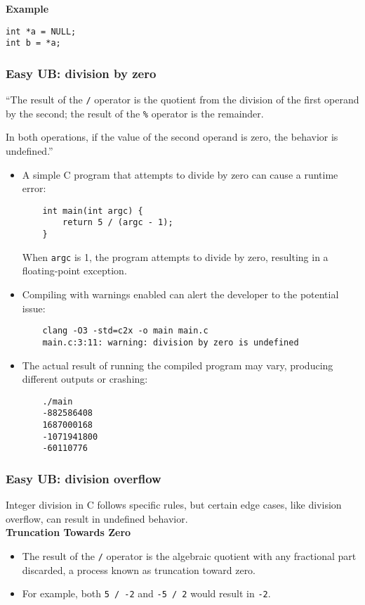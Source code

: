 \documentclass[12pt]{article}
\begin{document}
\textbf{Example}
\begin{verbatim}
int *a = NULL;
int b = *a;
\end{verbatim}

\subsubsection{Easy UB: division by zero}

``The result of the \texttt{/} operator is the quotient from the division of the first operand by the second;
the result of the \texttt{\%} operator is the remainder.

In both operations, if the value of the second operand is zero, the behavior is undefined.''

\begin{itemize}
    \item A simple C program that attempts to divide by zero can cause a runtime error:
    \begin{verbatim}
    int main(int argc) {
        return 5 / (argc - 1);
    }
    \end{verbatim}
    When \texttt{argc} is 1, the program attempts to divide by zero, resulting in a floating-point exception.

    \item Compiling with warnings enabled can alert the developer to the potential issue:
    \begin{verbatim}
    clang -O3 -std=c2x -o main main.c
    main.c:3:11: warning: division by zero is undefined
    \end{verbatim}
    
    \item The actual result of running the compiled program may vary, producing different outputs or crashing:
    \begin{verbatim}
    ./main
    -882586408
    1687000168
    -1071941800
    -60110776
    \end{verbatim}
\end{itemize}

\subsubsection{Easy UB: division overflow}
Integer division in C follows specific rules, but certain edge cases, like division overflow, can result in undefined behavior.\\

\textbf{Truncation Towards Zero}
\begin{itemize}
    \item The result of the \texttt{/} operator is the algebraic quotient with any fractional part discarded, a process known as truncation toward zero.
    \item For example, both \texttt{5 / -2} and \texttt{-5 / 2} would result in \texttt{-2}.
\end{itemize}
\end{document}
